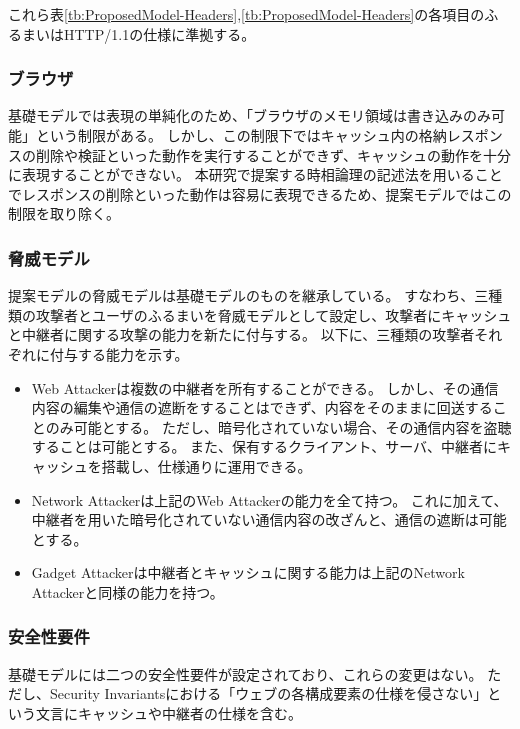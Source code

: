 \documentclass[journal]{IEEEtran}
\begin{document}
これら表\ref{tb:ProposedModel-Headers},\ref{tb:ProposedModel-Headers}の各項目のふるまいはHTTP/1.1の仕様に準拠する。

\subsubsection{ブラウザ}
基礎モデルでは表現の単純化のため、「ブラウザのメモリ領域は書き込みのみ可能」という制限がある。
しかし、この制限下ではキャッシュ内の格納レスポンスの削除や検証といった動作を実行することができず、キャッシュの動作を十分に表現することができない。
本研究で提案する時相論理の記述法を用いることでレスポンスの削除といった動作は容易に表現できるため、提案モデルではこの制限を取り除く。

\subsubsection{脅威モデル}
提案モデルの脅威モデルは基礎モデルのものを継承している。
すなわち、三種類の攻撃者とユーザのふるまいを脅威モデルとして設定し、攻撃者にキャッシュと中継者に関する攻撃の能力を新たに付与する。
以下に、三種類の攻撃者それぞれに付与する能力を示す。

\begin{itemize}
\item Web Attackerは複数の中継者を所有することができる。
しかし、その通信内容の編集や通信の遮断をすることはできず、内容をそのままに回送することのみ可能とする。
ただし、暗号化されていない場合、その通信内容を盗聴することは可能とする。
また、保有するクライアント、サーバ、中継者にキャッシュを搭載し、仕様通りに運用できる。
\item Network Attackerは上記のWeb Attackerの能力を全て持つ。
これに加えて、中継者を用いた暗号化されていない通信内容の改ざんと、通信の遮断は可能とする。
\item Gadget Attackerは中継者とキャッシュに関する能力は上記のNetwork Attackerと同様の能力を持つ。
\end{itemize}

\subsubsection{安全性要件}
基礎モデルには二つの安全性要件が設定されており、これらの変更はない。
ただし、Security Invariantsにおける「ウェブの各構成要素の仕様を侵さない」という文言にキャッシュや中継者の仕様を含む。
\end{document}
